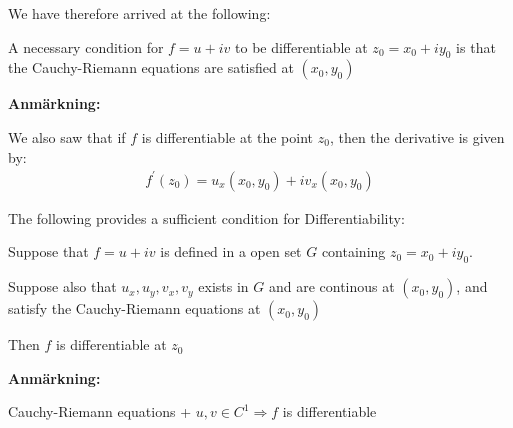 \par\bigskip
\noindent We have therefore arrived at the following:
\par\bigskip
\begin{theo}[]{}
  A necessary condition for $f = u+iv$ to be differentiable at $z_0 = x_0+iy_0$ is that the Cauchy-Riemann equations are satisfied at $(x_0,y_0)$
\end{theo}
\par\bigskip
\noindent\textbf{Anmärkning:}\par
\noindent We also saw that if $f$ is differentiable at the point $z_0$, then the derivative is given by:
\begin{equation*}
  \begin{gathered}
    f^{\prime}(z_0) = u_x(x_0,y_0)+iv_x(x_0,y_0)
  \end{gathered}
\end{equation*}
\par\bigskip
\noindent The following provides a sufficient condition for Differentiability:
\par\bigskip
\begin{theo}[]{}
  Suppose that $f = u+iv$ is defined in a open set $G$ containing $z_0 = x_0+iy_0$.\par
  \noindent Suppose also that $u_x,u_y,v_x,v_y$ exists in $G$ and are continous at $(x_0,y_0)$, and satisfy the Cauchy-Riemann equations at $(x_0,y_0)$
  \par\bigskip
  \noindent Then $f$ is differentiable at $z_0$
\end{theo}
\par\bigskip
\noindent\textbf{Anmärkning:}\par
\noindent Cauchy-Riemann equations + $u,v\in C^1\Rightarrow f$ is differentiable
\newpage
